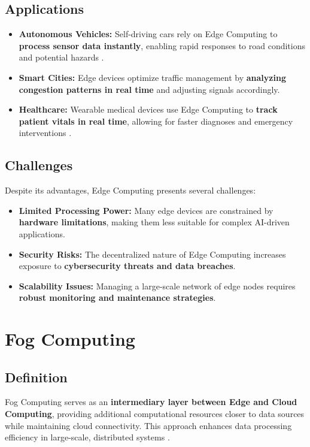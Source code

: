 \documentclass[conference]{IEEEtran}
\begin{document}
	\subsection{Applications}
	\begin{itemize}
		\item \textbf{Autonomous Vehicles:} Self-driving cars rely on Edge Computing to \textbf{process sensor data instantly}, enabling rapid responses to road conditions and potential hazards \cite{bonomi2012fog}.
		\item \textbf{Smart Cities:} Edge devices optimize traffic management by \textbf{analyzing congestion patterns in real time} and adjusting signals accordingly.
		\item \textbf{Healthcare:} Wearable medical devices use Edge Computing to \textbf{track patient vitals in real time}, allowing for faster diagnoses and emergency interventions \cite{cisco2015fog}.
	\end{itemize}
	
	\subsection{Challenges}
	Despite its advantages, Edge Computing presents several challenges:
	\begin{itemize}
		\item \textbf{Limited Processing Power:} Many edge devices are constrained by \textbf{hardware limitations}, making them less suitable for complex AI-driven applications.
		\item \textbf{Security Risks:} The decentralized nature of Edge Computing increases exposure to \textbf{cybersecurity threats and data breaches}.
		\item \textbf{Scalability Issues:} Managing a large-scale network of edge nodes requires \textbf{robust monitoring and maintenance strategies}.
	\end{itemize}
	
	\section{Fog Computing}
	\subsection{Definition}
	Fog Computing serves as an \textbf{intermediary layer between Edge and Cloud Computing}, providing additional computational resources closer to data sources while maintaining cloud connectivity. This approach enhances data processing efficiency in large-scale, distributed systems \cite{bonomi2012fog}.
	
\end{document}
